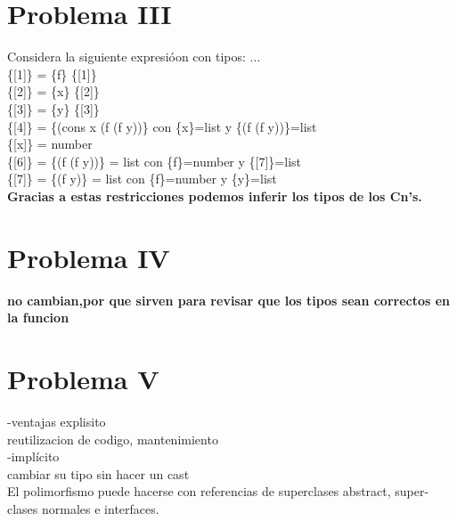 \documentclass{article}
\begin{document}
\section{Problema III}
Considera la siguiente expresióon con tipos:
...
\\

\{[1]\} = \{f\} \rightarrow \{[1]\}
\\
\{[2]\} = \{x\} \rightarrow \{[2]\}
\\
\{[3]\} = \{y\} \rightarrow \{[3]\}
\\
\{[4]\} = \{(cons\hspace{2mm} x \hspace{2mm} (f (f \hspace{2mm}y))\} \hspace{2mm} con \hspace{2mm}\{x\}=list \hspace{2mm} y \hspace{2mm} \{(f (f \hspace{2mm}y))\}=list
\\
\{[x]\} = number
\\
\{[6]\} = \{(f (f \hspace{2mm}y))\} = list \hspace{2mm} con \hspace{2mm}\{f\}=number \hspace{2mm} y \hspace{2mm} \{[7]\}=list
\\
\{[7]\} = \{(f \hspace{2mm}y)\} = list \hspace{2mm} con \hspace{2mm}\{f\}=number \hspace{2mm} y \hspace{2mm} \{y\}=list
\\
\textbf{Gracias a estas restricciones podemos inferir los tipos de los Cn's.}

\section{Problema IV} 
\textbf{no cambian,por que sirven para revisar que los tipos sean correctos en la funcion } 
\section{Problema V}
-ventajas explisito \\
reutilizacion de codigo, mantenimiento\\
-implícito\\
cambiar su tipo sin hacer un cast \\
El polimorfismo puede hacerse con referencias de superclases abstract, super-clases normales e interfaces.\\
\end{document}
